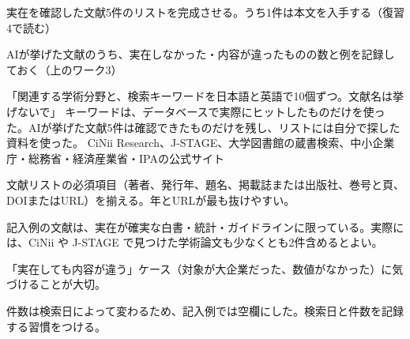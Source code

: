 \begin{nexttime}
  \item 実在を確認した文献5件のリストを完成させる。うち1件は本文を入手する（復習4で読む）
  \item AIが挙げた文献のうち、実在しなかった・内容が違ったものの数と例を記録しておく（上のワーク3）
\end{nexttime}
{「関連する学術分野と、検索キーワードを日本語と英語で10個ずつ。文献名は挙げないで」}
{キーワードは、データベースで実際にヒットしたものだけを使った。AIが挙げた文献5件は確認できたものだけを残し、リストには自分で探した資料を使った。}
{CiNii Research、J-STAGE、大学図書館の蔵書検索、中小企業庁・総務省・経済産業省・IPAの公式サイト}

\begin{point}
  \item 文献リストの必須項目（著者、発行年、題名、掲載誌または出版社、巻号と頁、DOIまたはURL）を揃える。年とURLが最も抜けやすい。
  \item 記入例の文献は、実在が確実な白書・統計・ガイドラインに限っている。実際には、CiNii や J-STAGE で見つけた学術論文も少なくとも2件含めるとよい。
  \item 「実在しても内容が違う」ケース（対象が大企業だった、数値がなかった）に気づけることが大切。
  \item 件数は検索日によって変わるため、記入例では空欄にした。検索日と件数を記録する習慣をつける。
\end{point}
